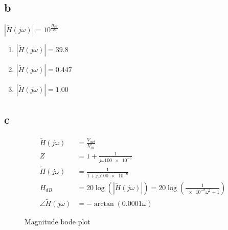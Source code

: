 \documentclass{article}
\begin{document}
\begin{multicols}{2}
    \subsection*{b}
    $|\tilde{H}(j\omega)| = 10^{\frac{H_{dB}}{20}}$
    \begin{enumerate}
        \item $|\tilde{H}(j\omega)| = \boxed{39.8}$
        \item $|\tilde{H}(j\omega)| = \boxed{0.447}$
        \item $|\tilde{H}(j\omega)| = \boxed{1.00}$
    \end{enumerate}
\end{multicols}
\subsection*{c}
\begin{align*}
    \tilde{H}(j\omega)       & = \frac{V_{out}}{V_{in}}                                                               \\
    Z                        & = 1+ \frac{1}{j\omega \num{100e-6}}                                                    \\
    \tilde{H}(j\omega)       & = \frac{1}{1 + j\omega\num{100e-6}}                                                    \\
    H_{dB}                   & = 20 \log(|\tilde{H}(j\omega)|) = 20\log\left(\frac{1}{\num{e-8}\omega^{2} + 1}\right) \\
    \angle\tilde{H}(j\omega) & = -\arctan\left(0.0001\omega\right)
\end{align*}
\begin{figure}
    \centering
    \caption{Magnitude bode plot}
    \label{fig:my_label}
\end{figure}
\end{document}
